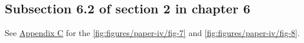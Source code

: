 \subsection{Subsection 6.2 of section 2 in chapter 6}
\label{subsec:labelsubsec6-2}
\lipsum[13-14]
See \hyperref[appendix:C]{Appendix C} for the \ref{fig:figures/paper-iv/fig-7} and \ref{fig:figures/paper-iv/fig-8}.


{}
\specialsection %
\headerspecialsection

{\hypersetup{urlcolor=ntnu,linkcolor=sophia} %


}